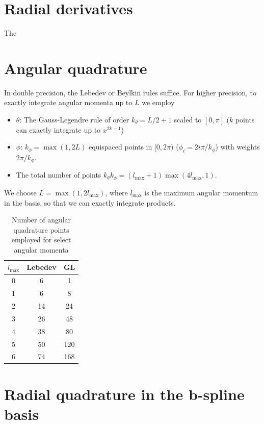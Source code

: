 \documentclass[12pt]{article}
\begin{document}
\section{Radial derivatives}

The 

\section{Angular quadrature}
In double precision, the Lebedev or Beylkin rules suffice.  For higher precision, to exactly integrate angular momenta up to $L$  we employ
\begin{itemize}
\item $\theta$: The Gauss-Legendre rule of order $k_\theta = L/2 + 1$ scaled to $[0,\pi]$ ($k$ points can exactly integrate up to $x^{2k-1}$)
\item $\phi$: $k_\phi = \max(1,2 L)$ equispaced points in $[0,2 \pi)$ ($\phi_i = 2 i \pi / k_\phi$) with weights $2 \pi / k_\phi$.
 \item The total number of points $k_\theta k_\phi = (l_{\mbox{max}} + 1) \max(4 l_{\mbox{max}},1) $.
\end{itemize}
We choose $L = \max(1, 2 l_{\mbox{max}})$, where $l_{\mbox{max}}$ is the maximum angular momentum in the basis, so that we can exactly integrate products.

\begin{table}
  \begin{center}
  \caption{Number of angular quadrature points employed for select angular momenta}
  \begin{tabular}{ccc}
    $l_{\mbox{max}}$ & Lebedev & GL  \\ \hline
    0 & 6 & 1 \\
    1 & 6 & 8 \\
    2 & 14 & 24 \\
    3 & 26 & 48 \\
    4 & 38 & 80 \\
    5 & 50 & 120 \\
    6 & 74 & 168 \\ \hline
  \end{tabular}
  \end{center}
\end{table}

\section{Radial quadrature in the b-spline basis}
\end{document}
